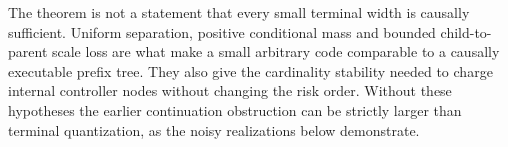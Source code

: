 The theorem is not a statement that every small terminal width is causally sufficient. Uniform separation, positive conditional mass and bounded child-to-parent scale loss are what make a small arbitrary code comparable to a causally executable prefix tree. They also give the cardinality stability needed to charge internal controller nodes without changing the risk order. Without these hypotheses the earlier continuation obstruction can be strictly larger than terminal quantization, as the noisy realizations below demonstrate.
